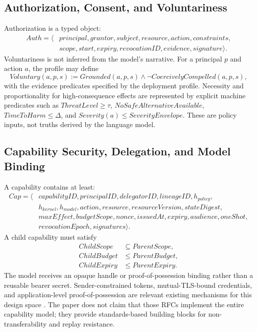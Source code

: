 \documentclass[11pt]{article}
\def\ensuremath#1{#1}%
\def\mathrm#1{#1}%
\def\mathsf#1{#1}%
\newcommand{\ModelHash}{\ensuremath{h_{\mathrm{model}}}}
\newcommand{\PolicyHash}{\ensuremath{h_{\mathrm{policy}}}}
\newcommand{\KernelHash}{\ensuremath{h_{\mathrm{kernel}}}}
\begin{document}
\subsection{Authorization, Consent, and Voluntariness}
Authorization is a typed object:
\[
\begin{aligned}
\mathsf{Auth}=\langle&principal,grantor,subject,resource,action,constraints,\\
&scope,start,expiry,revocationID,evidence,signature\rangle.
\end{aligned}
\]
Voluntariness is not inferred from the model's narrative. For a principal \(p\) and action \(a\), the profile may define
\[
\mathrm{Voluntary}(a,p,s):=\mathrm{Grounded}(a,p,s)\land\neg\mathrm{CoercivelyCompelled}(a,p,s),
\]
with the evidence predicates specified by the deployment profile. Necessity and proportionality for high-consequence effects are represented by explicit machine predicates such as \(ThreatLevel\ge\tau\), \(NoSafeAlternativeAvailable\), \(TimeToHarm\le\Delta\), and \(Severity(a)\le SeverityEnvelope\). These are policy inputs, not truths derived by the language model.

\subsection{Capability Security, Delegation, and Model Binding}
A capability contains at least:
\[
\begin{aligned}
\mathsf{Cap}=\langle&capabilityID,principalID,delegatorID,lineageID,\PolicyHash,\\
&\KernelHash,\ModelHash,action,resource,resourceVersion,stateDigest,\\
&maxEffect,budgetScope,nonce,issuedAt,expiry,audience,oneShot,\\
&revocationEpoch,signatures\rangle.
\end{aligned}
\]
A child capability must satisfy
\[
\begin{aligned}
\mathit{ChildScope}&\subseteq \mathit{ParentScope},\\
\mathit{ChildBudget}&\le \mathit{ParentBudget},\\
\mathit{ChildExpiry}&\le \mathit{ParentExpiry}.
\end{aligned}
\]
The model receives an opaque handle or proof-of-possession binding rather than a reusable bearer secret. Sender-constrained tokens, mutual-TLS-bound credentials, and application-level proof-of-possession are relevant existing mechanisms for this design space \cite{rfc8705,rfc9449}. The paper does not claim that those RFCs implement the entire capability model; they provide standards-based building blocks for non-transferability and replay resistance.
\end{document}
